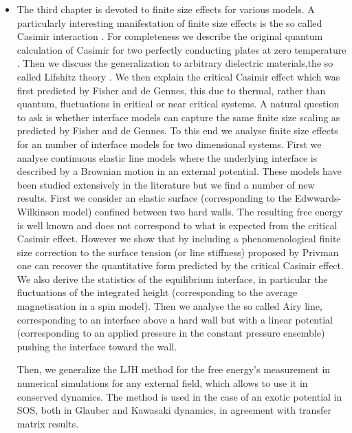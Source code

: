\begin{itemize}
    \item The third chapter is devoted to finite size effects for various models. A particularly interesting manifestation of finite size effects is the so called Casimir interaction \cite{kimball_a_milton_casimir_2001}. For completeness we describe the original quantum calculation of Casimir for two perfectly conducting plates at zero temperature \cite{h_b_g_casimir_attraction_1948}. Then we discuss the generalization to arbitrary  dielectric materials,the so called Lifshitz theory \cite{lifshits_theory_1955}. We then explain the critical Casimir effect which was first predicted by Fisher and de Gennes, this due to thermal, rather than quantum, fluctuations in critical or near critical systems. A natural question to ask is whether interface models can capture the same finite size scaling as predicted by Fisher and de Gennes. To this end we analyse finite size effects for an number of interface models for two dimensional systems. First we analyse continuous elastic line models where the underlying interface is described by a Brownian motion in an external potential. These models have been studied extensively in the literature but we find a number of new results. First we consider an elastic surface (corresponding to the Edwwards-Wilkinson model) confined between two hard walls. The resulting free energy is well known and does not correspond to what is expected from the critical Casimir effect. However we show that by including a phenomenological finite size correction to the surface tension (or line stiffness) proposed by Privman \cite{privman_finite-size_1988-1} one can recover the quantitative form predicted by the critical Casimir effect. 
We also derive the statistics of the equilibrium interface, in particular the fluctuations of the integrated height (corresponding to the average magnetisation in a spin model). 
Then we analyse the so called Airy line, corresponding to an interface above a hard wall but with a linear potential (corresponding to an applied pressure in the constant pressure ensemble) pushing the interface toward the wall.

Then, we generalize the LJH method \cite{lopes_cardozo_critical_2014} for the free energy's measurement in numerical simulations for any external field, which allows to use it in conserved dynamics. The method is used in the case of an exotic potential in SOS, both in Glauber and Kawasaki dynamics, in agreement with transfer matrix results.


\end{itemize}
